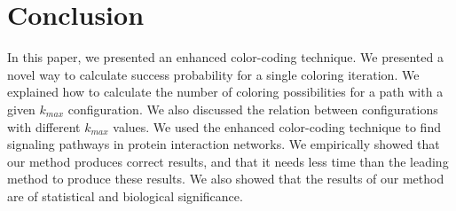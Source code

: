 \documentclass{ws-procs11x85}
\begin{document}
\section{Conclusion}
\label{sec:conc}

{\small
In this paper, we presented an enhanced color-coding technique. We presented a
novel way to calculate success probability for a single coloring iteration. We
explained how to calculate the number of coloring possibilities for a path
with a given $k_{max}$ configuration. We also discussed the relation between
configurations with different $k_{max}$ values. We used the enhanced
color-coding technique to find signaling pathways in protein interaction
networks. We empirically showed that our method produces correct results, and
that it needs less time than the leading method to produce these results. We
also showed that the results of our method are of statistical and biological
significance.}



\end{document}

